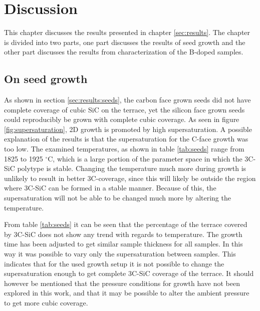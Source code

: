 
\chapter{Discussion}
\label{sec:discussion}
This chapter discusses the results presented in chapter \ref{sec:results}. The chapter is divided into two parts, one part discusses the results of seed growth and the other part discusses the results from characterization of the B-doped samples. 

\section{On seed growth}
As shown in section \ref{sec:results:seeds}, the carbon face grown seeds did not have complete coverage of cubic SiC on the terrace, yet the silicon face grown seeds could reproducibly be grown with complete cubic coverage. As seen in figure \ref{fig:supersaturation}, 2D growth is promoted by high supersaturation. A possible explanation of the results is that the supersaturation for the C-face growth was too low. The examined temperatures, as shown in table \ref{tab:seeds}  range from 1825 to 1925 $^\circ$C, which is a large portion of the parameter space in which the 3C-SiC polytype is stable. Changing the temperature much more during growth is unlikely to result in better 3C-coverage, since this will likely be outside the region where 3C-SiC can be formed in a stable manner. Because of this, the supersaturation will not be able to be changed much more by altering the temperature. 

From table \ref{tab:seeds} it can be seen that the percentage of the terrace covered by 3C-SiC does not show any trend with regards to temperature. The growth time has been adjusted to get similar sample thickness for all samples. In this way it was possible to vary only the supersaturation between samples. This indicates that for the used growth setup it is not possible to change the supersaturation enough to get complete 3C-SiC coverage of the terrace. It should however be mentioned that the pressure conditions for growth have not been explored in this work, and that it may be possible to alter the ambient pressure to get more cubic coverage. 

